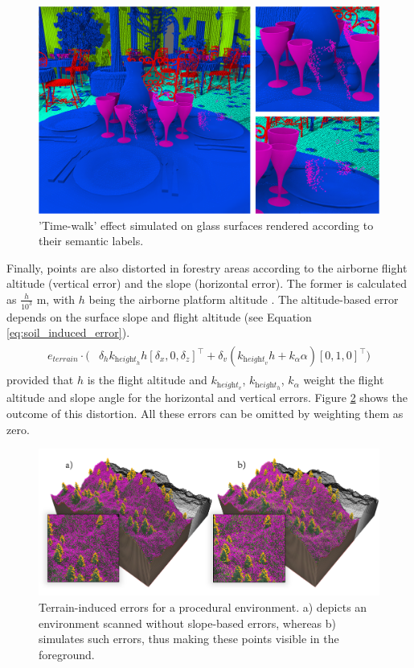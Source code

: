 \begin{figure}
	\centering
	\includegraphics[width=.8\linewidth]{figs/lidar_simulation/glossy_time_walk.png}
	\caption{'Time-walk' effect simulated on glass surfaces rendered according to their semantic labels. }
	\label{fig:shiny_surface_error}
\end{figure}

Finally, points are also distorted in forestry areas according to the airborne flight altitude (vertical error) and the slope (horizontal error). The former is calculated as $\frac{h}{10^3}$ \si{\meter}, with $h$ being the airborne platform altitude \cite{hodgson_accuracy_2004}. The altitude-based error depends on the surface slope and flight altitude \cite{baltsavias_comparison_1999} (see Equation \ref{eq:soil_induced_error}).
\begin{gather}
    \label{eq:soil_induced_error}
    \begin{aligned}
        e_{\textit{terrain}} \cdot (&\delta_{h} k_{\textit{height}_{h}} h 
        \left[\delta_{x}, 0, \delta_{z}\right]^\intercal + \delta_{v} (k_{\textit{height}_{v}} h + k_{\alpha} \alpha)
        \left[0, 1, 0\right]^\intercal)
    \end{aligned}
\end{gather}
provided that $h$ is the flight altitude and $k_{\textit{height}_{v}}$, $k_{\textit{height}_{h}}$,  $k_{\alpha}$ weight the flight altitude and slope angle for the horizontal and vertical errors. Figure \ref{fig:terrain_induced_errors} shows the outcome of this distortion. All these errors can be omitted by weighting them as zero.

\begin{figure}
    \centering
    \includegraphics[width=\linewidth]{figs/lidar_simulation/terrain_induced_errors.png}
	\caption{Terrain-induced errors for a procedural environment. a) depicts an environment scanned without slope-based errors, whereas b) simulates such errors, thus making these points visible in the foreground. }
	\label{fig:terrain_induced_errors}
\end{figure}

